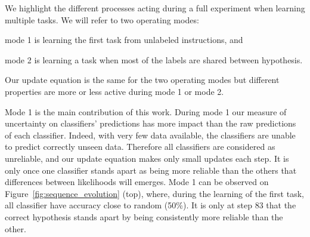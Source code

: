 We highlight the different processes acting during a full experiment when learning multiple tasks. We will refer to two operating modes: \begin{inparaenum}[a)] \item mode 1 is learning the first task from unlabeled instructions, and \item mode 2 is learning a task when most of the labels are shared between hypothesis. \end{inparaenum} Our update equation is the same for the two operating modes but different properties are more or less active during mode 1 or mode 2.


Mode 1 is the main contribution of this work. During mode 1 our measure of uncertainty on classifiers' predictions has more impact than the raw predictions of each classifier. Indeed, with very few data available, the classifiers are unable to predict correctly unseen data.
Therefore all classifiers are considered as unreliable, and our update equation makes only small updates each step. It is only once one classifier stands apart as being more reliable than the others that differences between likelihoods will emerges. Mode 1 can be observed on Figure~\ref{fig:sequence_evolution} (top), where, during the learning of the first task, all classifier have accuracy close to random (50\%). It is only at step 83 that the correct hypothesis stands apart by being consistently more reliable than the other.


